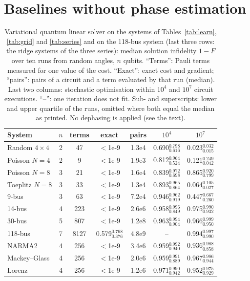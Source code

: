 \documentclass[journal]{IEEEtran}
\begin{document}
\section{Baselines without phase estimation}
\label{sec:vqls}

\begin{table}[t]
\caption{Variational quantum linear solver on the systems of Tables~\ref{tab:learn}, \ref{tab:grid} and \ref{tab:series} and on the 118-bus system (last three rows: the ridge systems of the three series): median solution infidelity $1-F$ over ten runs from random angles, $n$ qubits. ``Terms'': Pauli terms measured for one value of the cost. ``Exact'': exact cost and gradient; ``pairs'': pairs of a circuit and a term evaluated by that run (median). Last two columns: stochastic optimisation within $10^4$ and $10^7$ circuit executions. ``--'': one iteration does not fit. Sub- and superscripts: lower and upper quartile of the runs, omitted where both equal the median as printed. No dephasing is applied (see the text).}
\label{tab:vqls}
\centering\footnotesize\renewcommand{\arraystretch}{1.3}
\setlength{\tabcolsep}{3pt}
\begin{tabular}{lcccccc}
\toprule
System & $n$ & terms & exact & pairs & $10^4$ & $10^7$\\
\midrule
Random $4\times4$ & 2 & 47 & $<$1e-9 & 1.3e4 & 0.690$_{0.616}^{0.798}$ & 0.023$_{0.015}^{0.032}$\\
Poisson $N=4$ & 2 & 9 & $<$1e-9 & 1.9e3 & 0.812$_{0.524}^{0.964}$ & 0.121$_{0.042}^{0.249}$\\
Poisson $N=8$ & 3 & 21 & $<$1e-9 & 1.6e4 & 0.839$_{0.698}^{0.972}$ & 0.865$_{0.799}^{0.920}$\\
Toeplitz $N=8$ & 3 & 33 & $<$1e-9 & 1.3e4 & 0.893$_{0.864}^{0.965}$ & 0.064$_{0.027}^{0.105}$\\
9-bus & 3 & 63 & $<$1e-9 & 7.2e4 & 0.946$_{0.919}^{0.962}$ & 0.447$_{0.260}^{0.667}$\\
14-bus & 4 & 223 & $<$1e-9 & 2.6e6 & 0.958$_{0.849}^{0.996}$ & 0.975$_{0.932}^{0.990}$\\
30-bus & 5 & 807 & $<$1e-9 & 1.2e8 & 0.963$_{0.904}^{0.994}$ & 0.966$_{0.950}^{0.999}$\\
118-bus & 7 & 8127 & 0.579$_{0.376}^{0.768}$ & 4.8e9 & -- & 0.994$_{0.990}^{0.997}$\\
NARMA2 & 4 & 256 & $<$1e-9 & 3.4e6 & 0.959$_{0.940}^{0.992}$ & 0.936$_{0.858}^{0.988}$\\
Mackey--Glass & 4 & 256 & $<$1e-9 & 2.0e6 & 0.959$_{0.889}^{0.991}$ & 0.967$_{0.944}^{0.986}$\\
Lorenz & 4 & 256 & $<$1e-9 & 1.2e6 & 0.971$_{0.942}^{0.990}$ & 0.952$_{0.929}^{0.975}$\\
\bottomrule
\end{tabular}
\end{table}
\end{document}
